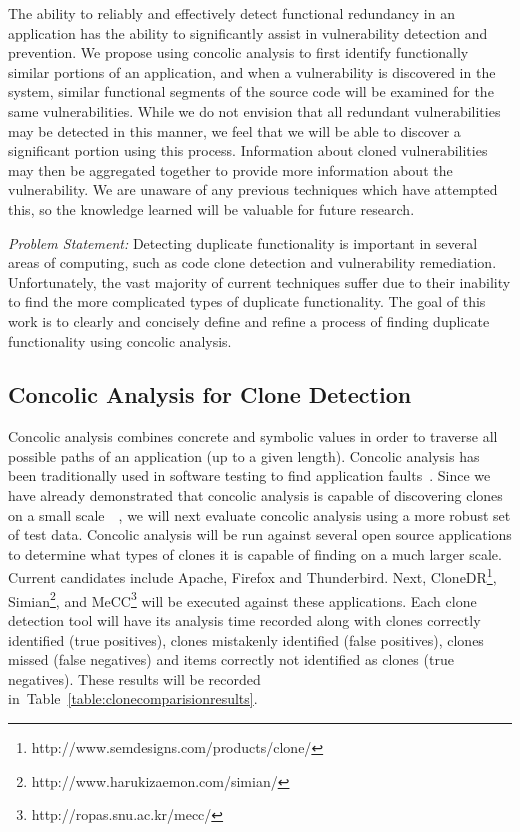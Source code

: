 \documentclass{article}
\begin{document}
The ability to reliably and effectively detect functional redundancy in an application has the ability to significantly assist in vulnerability detection and prevention. We propose using concolic analysis to first identify functionally similar portions of an application, and when a vulnerability is discovered in the system, similar functional segments of the source code will be examined for the same vulnerabilities. While we do not envision that all redundant vulnerabilities may be detected in this manner, we feel that we will be able to discover a significant portion using this process. Information about cloned vulnerabilities may then be aggregated together to provide more information about the vulnerability. We are unaware of any previous techniques which have attempted this, so the knowledge learned will be valuable for future research. 


\emph{Problem Statement: }Detecting duplicate functionality is important in several areas of computing, such as code clone detection and vulnerability remediation. Unfortunately, the vast majority of current techniques suffer due to their inability to find the more complicated types of duplicate functionality. The goal of this work is to clearly and concisely define and refine a process of finding duplicate functionality using concolic analysis.  

\subsection{Concolic Analysis for Clone Detection}

Concolic analysis combines concrete and symbolic values in order to traverse all possible paths of an application (up to a given length). Concolic analysis has been traditionally used in software testing to find application faults~\cite{Kim:2012:IAC:2337223.2337373}. Since we have already demonstrated that concolic analysis is capable of discovering clones on a small scale~\cite{wcre2013}~\cite{Dan123}, we will next evaluate concolic analysis using a more robust set of test data. Concolic analysis will be run against several open source applications to determine what types of clones it is capable of finding on a much larger scale. Current candidates include Apache, Firefox and Thunderbird. Next, CloneDR\footnote{http://www.semdesigns.com/products/clone/}, Simian\footnote{http://www.harukizaemon.com/simian/}, and MeCC\footnote{http://ropas.snu.ac.kr/mecc/} will be executed against these applications. Each clone detection tool will have its analysis time recorded along with clones correctly identified (true positives), clones mistakenly identified (false positives), clones missed (false negatives) and items correctly not identified as clones (true negatives). These results will be recorded in~Table~\ref{table:clonecomparisionresults}. 
\end{document}
